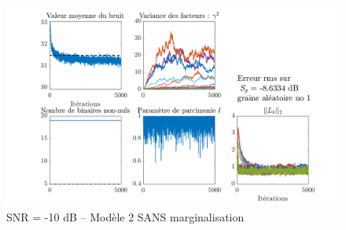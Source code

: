 \documentclass[ 12pt]{article}
\begin{document}
\begin{figure}[H]
	\centering
	\includegraphics[width=\textwidth]{ToyCase/margoff_snrm10db.png}
	\caption{SNR = -10 dB -- Modèle 2 SANS marginalisation}
\end{figure}
\end{document}
